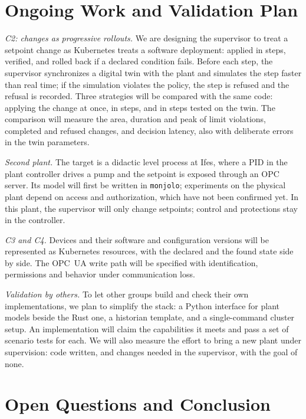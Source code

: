 \documentclass[conference]{IEEEtran}
\begin{document}
\section{Ongoing Work and Validation Plan}
\label{sec:ongoing}

\textit{C2: changes as progressive rollouts.} We are designing the supervisor to treat a setpoint change as Kubernetes treats a software deployment: applied in steps, verified, and rolled back if a declared condition fails. Before each step, the supervisor synchronizes a digital twin with the plant and simulates the step faster than real time; if the simulation violates the policy, the step is refused and the refusal is recorded. Three strategies will be compared with the same code: applying the change at once, in steps, and in steps tested on the twin. The comparison will measure the area, duration and peak of limit violations, completed and refused changes, and decision latency, also with deliberate errors in the twin parameters.

\textit{Second plant.} The target is a didactic level process at Ifes, where a PID in the plant controller drives a pump and the setpoint is exposed through an OPC server. Its model will first be written in \texttt{monjolo}; experiments on the physical plant depend on access and authorization, which have not been confirmed yet. In this plant, the supervisor will only change setpoints; control and protections stay in the controller.

\textit{C3 and C4.} Devices and their software and configuration versions will be represented as Kubernetes resources, with the declared and the found state side by side. The OPC~UA write path will be specified with identification, permissions and behavior under communication loss.

\textit{Validation by others.} To let other groups build and check their own implementations, we plan to simplify the stack: a Python interface for plant models beside the Rust one, a historian template, and a single-command cluster setup. An implementation will claim the capabilities it meets and pass a set of scenario tests for each. We will also measure the effort to bring a new plant under supervision: code written, and changes needed in the supervisor, with the goal of none.

\section{Open Questions and Conclusion}
\end{document}
